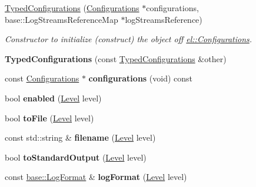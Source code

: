 \begin{DoxyCompactItemize}
\item 
\hyperlink{a00092_a1b6d90479bb79da27c3e351a9be593ae}{Typed\+Configurations} (\hyperlink{a00014}{Configurations} $\ast$configurations, base\+::\+Log\+Streams\+Reference\+Map $\ast$log\+Streams\+Reference)
\begin{DoxyCompactList}\small\item\em Constructor to initialize (construct) the object off \hyperlink{a00014}{el\+::\+Configurations}. \end{DoxyCompactList}\item 
\hypertarget{a00092_ae7b346e5d32305d4957bc6c564409090}{}{\bfseries Typed\+Configurations} (const \hyperlink{a00092}{Typed\+Configurations} \&other)\label{a00092_ae7b346e5d32305d4957bc6c564409090}

\item 
\hypertarget{a00092_a65d2ec91ff7edc07db304ebd9c30291f}{}const \hyperlink{a00014}{Configurations} $\ast$ {\bfseries configurations} (void) const \label{a00092_a65d2ec91ff7edc07db304ebd9c30291f}

\item 
\hypertarget{a00092_a924b35df988103c737907cc7993c3c1c}{}bool {\bfseries enabled} (\hyperlink{a00183_ab0ac6091262344c52dd2d3ad099e8e36}{Level} level)\label{a00092_a924b35df988103c737907cc7993c3c1c}

\item 
\hypertarget{a00092_a20b9a1bd152cad3b72b558f97de3876b}{}bool {\bfseries to\+File} (\hyperlink{a00183_ab0ac6091262344c52dd2d3ad099e8e36}{Level} level)\label{a00092_a20b9a1bd152cad3b72b558f97de3876b}

\item 
\hypertarget{a00092_a6a7871c0c37c3306334e90dfdc1d2e47}{}const std\+::string \& {\bfseries filename} (\hyperlink{a00183_ab0ac6091262344c52dd2d3ad099e8e36}{Level} level)\label{a00092_a6a7871c0c37c3306334e90dfdc1d2e47}

\item 
\hypertarget{a00092_aeaa7bf7448319bc41e4e226124288c7e}{}bool {\bfseries to\+Standard\+Output} (\hyperlink{a00183_ab0ac6091262344c52dd2d3ad099e8e36}{Level} level)\label{a00092_aeaa7bf7448319bc41e4e226124288c7e}

\item 
\hypertarget{a00092_a5d4d84a3dda6d54e0f291917703db441}{}const \hyperlink{a00046}{base\+::\+Log\+Format} \& {\bfseries log\+Format} (\hyperlink{a00183_ab0ac6091262344c52dd2d3ad099e8e36}{Level} level)\label{a00092_a5d4d84a3dda6d54e0f291917703db441}


\end{DoxyCompactItemize}
